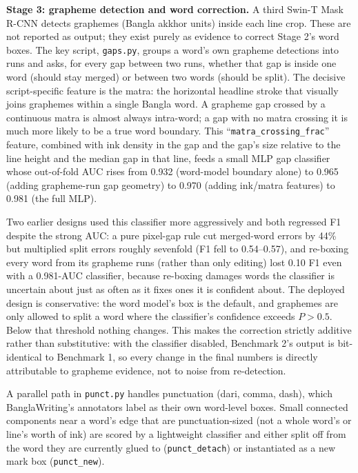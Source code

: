 \documentclass[10.5pt,a4paper]{article}
\begin{document}
\textbf{Stage 3: grapheme detection and word correction.} A third Swin-T Mask R-CNN detects graphemes (Bangla akkhor units) inside each line crop. These are not reported as output; they exist purely as evidence to correct Stage 2's word boxes. The key script, \texttt{gaps.py}, groups a word's own grapheme detections into runs and asks, for every gap between two runs, whether that gap is inside one word (should stay merged) or between two words (should be split). The decisive script-specific feature is the matra: the horizontal headline stroke that visually joins graphemes within a single Bangla word. A grapheme gap crossed by a continuous matra is almost always intra-word; a gap with no matra crossing it is much more likely to be a true word boundary. This ``\texttt{matra\_crossing\_frac}'' feature, combined with ink density in the gap and the gap's size relative to the line height and the median gap in that line, feeds a small MLP gap classifier whose out-of-fold AUC rises from 0.932 (word-model boundary alone) to 0.965 (adding grapheme-run gap geometry) to 0.970 (adding ink/matra features) to 0.981 (the full MLP).

Two earlier designs used this classifier more aggressively and both regressed F1 despite the strong AUC: a pure pixel-gap rule cut merged-word errors by 44\% but multiplied split errors roughly sevenfold (F1 fell to 0.54--0.57), and re-boxing every word from its grapheme runs (rather than only editing) lost 0.10 F1 even with a 0.981-AUC classifier, because re-boxing damages words the classifier is uncertain about just as often as it fixes ones it is confident about. The deployed design is conservative: the word model's box is the default, and graphemes are only allowed to split a word where the classifier's confidence exceeds $P>0.5$. Below that threshold nothing changes. This makes the correction strictly additive rather than substitutive: with the classifier disabled, Benchmark 2's output is bit-identical to Benchmark 1, so every change in the final numbers is directly attributable to grapheme evidence, not to noise from re-detection.

A parallel path in \texttt{punct.py} handles punctuation (dari, comma, dash), which BanglaWriting's annotators label as their own word-level boxes. Small connected components near a word's edge that are punctuation-sized (not a whole word's or line's worth of ink) are scored by a lightweight classifier and either split off from the word they are currently glued to (\texttt{punct\_detach}) or instantiated as a new mark box (\texttt{punct\_new}).
\end{document}

